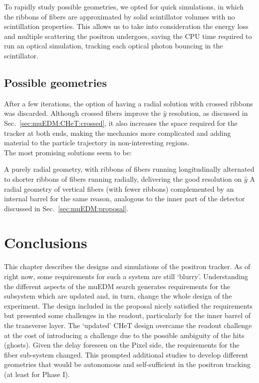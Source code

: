 \begin{refsection}
    \noindent
    To rapidly study possible geometries, we opted for quick \gf simulations, in which the ribbons of fibers are approximated by solid scintillator volumes with no scintillation properties.
    This allows us to take into consideration the energy loss and multiple scattering the positron undergoes, saving the CPU time required to run an optical simulation, tracking each optical photon bouncing in the scintillator.\\

    \subsection{Possible geometries}
        After a few iterations, the option of having a radial solution with crossed ribbons was discarded. 
        Although crossed fibers improve the $\hat{y}$ resolution, as discussed in Sec.~\ref{sec:muEDM:CHeT:crossed}, it also increases the space required for the tracker at both ends, making the mechanics more complicated and adding material to the particle trajectory in non-interesting regions.\\

        \noindent
        The most promising solutions seem to be:
        \begin{outline}
            \1 A purely radial geometry, with ribbons of fibers running longitudinally alternated to shorter ribbons of fibers running radially, delivering the good resolution on $\hat{y}$
            \1 A radial geometry of vertical fibers (with fewer ribbons) complemented by an internal barrel for the same reason, analogous to the inner part of the detector discussed in Sec.~\ref{sec:muEDM:proposal}.
        \end{outline}
        

\section{Conclusions}
    This chapter describes the designs and simulations of the positron tracker.
    As of right now, some requirements for such a system are still `blurry'.
    Understanding the different aspects of the muEDM search generates requirements for the subsystem which are updated and, in turn, change the whole design of the experiment.
    The design included in the proposal nicely satisfied the requirements but presented some challenges in the readout, particularly for the inner barrel of the transverse layer.
    The `updated' CHeT design overcame the readout challenge at the cost of introducing a challenge due to the possible ambiguity of the hits (ghosts).
    Given the delay foreseen on the Pixel side, the requirements for the fiber sub-system changed.
    This prompted additional studies to develop different geometries that would be autonomous and self-sufficient in the positron tracking (at least for Phase I).
    
\printbibliography[
    heading = bibliographychapter,
    title=Bibliography on muEDM positron tracker
]

\end{refsection}